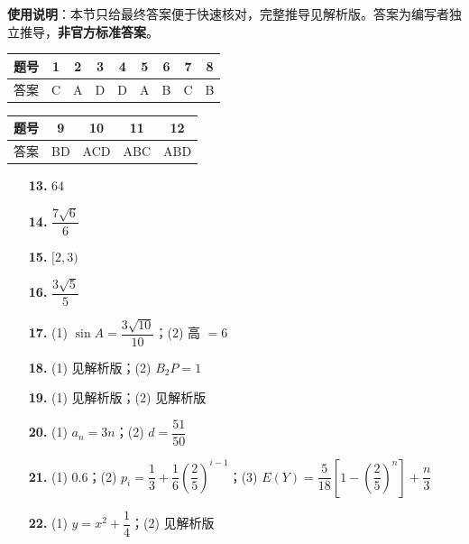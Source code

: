 
\begin{gknotice}
\textbf{使用说明}：本节只给最终答案便于快速核对，完整推导见解析版。答案为编写者独立推导，\textbf{非官方标准答案}。
\end{gknotice}

\begin{center}\begin{tabular}{ccccccccc}
\toprule
题号 & 1 & 2 & 3 & 4 & 5 & 6 & 7 & 8 \\
\midrule
答案 & C & A & D & D & A & B & C & B \\
\bottomrule
\end{tabular}\end{center}

\begin{center}\begin{tabular}{ccccc}
\toprule
题号 & 9 & 10 & 11 & 12 \\
\midrule
答案 & BD & ACD & ABC & ABD \\
\bottomrule
\end{tabular}\end{center}

\begin{itemize}[leftmargin=2.6em]
  \item[\textbf{13.}] $64$
  \item[\textbf{14.}] $\dfrac{7\sqrt6}6$
  \item[\textbf{15.}] $[2,3)$
  \item[\textbf{16.}] $\dfrac{3\sqrt5}5$
\end{itemize}

\begin{itemize}[leftmargin=2.6em]
  \item[\textbf{17.}] (1) $\sin A=\dfrac{3\sqrt{10}}{10}$；(2) 高 $=6$
  \item[\textbf{18.}] (1) 见解析版；(2) $B_2P=1$
  \item[\textbf{19.}] (1) 见解析版；(2) 见解析版
  \item[\textbf{20.}] (1) $a_n=3n$；(2) $d=\dfrac{51}{50}$
  \item[\textbf{21.}] (1) $0.6$；(2) $p_i=\dfrac13+\dfrac16\left(\dfrac25\right)^{i-1}$；(3) $E(Y)=\dfrac5{18}\left[1-\left(\dfrac25\right)^n\right]+\dfrac n3$
  \item[\textbf{22.}] (1) $y=x^2+\dfrac14$；(2) 见解析版
\end{itemize}
